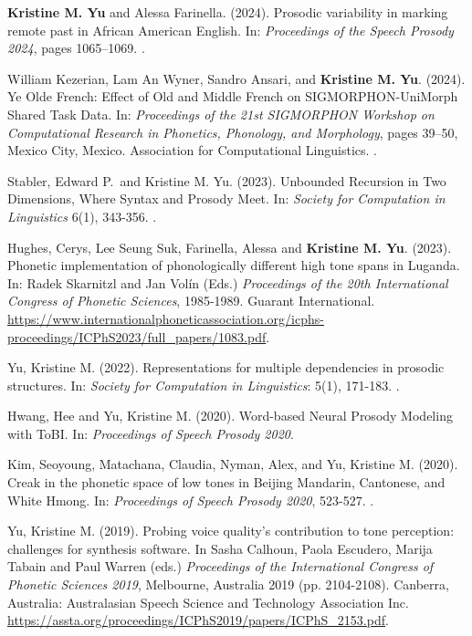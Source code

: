 \documentclass[10pt]{article}
\begin{document}
\begin{bibenum}

\item \textbf{Kristine M. Yu} and Alessa Farinella. (2024). Prosodic variability in marking remote past in African American English. In:  \emph{Proceedings of the Speech Prosody 2024}, pages 1065–1069. .

\item William Kezerian, Lam An Wyner, Sandro Ansari, and \textbf{Kristine M. Yu}. (2024). Ye Olde French: Effect of Old and Middle French on SIGMORPHON-UniMorph Shared Task Data. In:  \emph{Proceedings of the 21st SIGMORPHON Workshop on Computational Research in Phonetics, Phonology, and Morphology}, pages 39–50, Mexico City, Mexico. Association for Computational Linguistics. .

\item Stabler, Edward P.~and Kristine M. Yu. (2023). Unbounded Recursion in Two Dimensions, Where Syntax and Prosody Meet. In:  \emph{Society for Computation in Linguistics} 6(1), 343-356. .

\item Hughes, Cerys, Lee Seung Suk, Farinella, Alessa and \textbf{Kristine M. Yu}. (2023). Phonetic implementation of phonologically different high tone spans in Luganda. In:  Radek Skarnitzl and Jan Volín (Eds.) \emph{Proceedings of the 20th International Congress of Phonetic Sciences}, 1985-1989. Guarant International. \url{https://www.internationalphoneticassociation.org/icphs-proceedings/ICPhS2023/full_papers/1083.pdf}.

\item Yu, Kristine M. (2022). Representations for multiple dependencies in prosodic structures. In: \emph{Society for Computation in Linguistics}: 5(1), 171-183. .

\item Hwang, Hee and Yu, Kristine M. (2020). Word-based Neural Prosody Modeling with ToBI. In: \emph{Proceedings of Speech Prosody 2020}.

\item Kim, Seoyoung, Matachana, Claudia, Nyman, Alex, and Yu, Kristine M. (2020). Creak in the phonetic space of low tones in Beijing Mandarin, Cantonese, and
White Hmong. In: \emph{Proceedings of Speech Prosody 2020}, 523-527. .

\item Yu, Kristine M. (2019). Probing voice quality's contribution to tone perception: challenges for synthesis software. In Sasha Calhoun, Paola Escudero, Marija Tabain and Paul Warren (eds.) \emph{Proceedings of the International Congress of Phonetic Sciences 2019}, Melbourne, Australia 2019 (pp. 2104-2108). Canberra, Australia: Australasian Speech Science and Technology Association Inc. \url{https://assta.org/proceedings/ICPhS2019/papers/ICPhS_2153.pdf}.


\end{bibenum}
\end{document}
